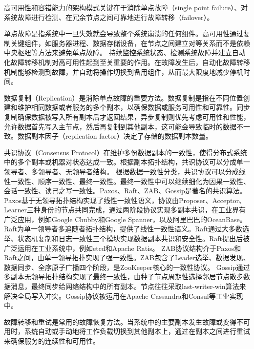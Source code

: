 高可用性和容错能力的架构模式关键在于消除单点故障（single point failure）、对系统故障进行检测、在冗余节点之间可靠地进行故障转移（failover）。

单点故障是指系统中一旦失效就会导致整个系统崩溃的任何组件。高可用性通过复制关键组件，如服务器进程、数据存储设备，在节点之间建立对等关系而不是依赖中央枢纽等方法来避免单点故障。
持续监控系统状态、检测系统故障并建立自动化故障转移机制对高可用性起到至关重要的作用。在故障发生后，自动化故障转移机制能够检测到故障，并自动将操作切换到备用组件，从而最大限度地减少停机时间。


数据复制（Replication）是消除单点故障的重要方法。数据复制是指在不同位置创建和维护相同数据或者服务的多个副本，以确保数据或服务可用性和可靠性。同步复制确保数据被写入所有副本后才返回结果，异步复制则优先考虑可用性和性能，允许数据首先写入主节点，然后再复制到其他副本，这可能会导致临时的数据不一致。数据副本因子（replication factor）决定了存储的数据副本数量。


共识协议（Consensus Protocol）在维护多份数据副本的一致性，使得分布式系统中的多个副本或机器对状态达成一致。根据副本拓扑结构，共识协议可以分成单一领导者、多领导者、无领导者结构。
根据数据一致性分类，共识协议可以分成线性一致性\cite{herlihy1990linearizability}、顺序一致性\cite{attiya1994sequential}、最终一致性\cite{bailis2013eventual}。最终一致性中可以继续细化为因果一致性\cite{lloyd2011cops}、会话一致性\cite{mortazavi2018session}、读己之写一致性\cite{nishtala2013memcached}。Paxos、Raft、ZAB、Gossip是著名的共识算法。
Paxos\cite{lamport2001paxos}基于无领导拓扑结构实现了线性一致性语义，协议由Proposer、Acceptor、Learner三种身份的节点共同完成，通过两阶段协议实现多副本共识，在工业界有广泛应用，例如Google Chubby\cite{burrows2006chubby}和Google Spanner\cite{corbett2013spanner}，以及阿里巴巴的OceanBase\cite{zhen2014oceanbase}。
Raft\cite{ongaro2014raft}为单一领导者多追随者拓扑结构，提供了线性一致性语义。Raft通过大多数选举、状态机复制和日志一致性三个模块实现数据副本共识和安全性。Raft提出后被广泛运用在工业系统中，例如etcd\cite{etcd}和Apache Ratis\cite{ratis}。
ZAB\cite{junqueira2011zab}协议结构介于Paxos和Raft之间，由单一领导拓扑实现了强一致性。ZAB包含了Leader选举、数据发现、数据同步、全序原子广播四个阶段，是ZooKeeper\cite{hunt2010zookeeper}核心的一致性协议。
Gossip\cite{demers1987gossip}通过多副本无领导拓扑结构实现了最终一致性，由种子节点周期性选择邻居节点散步数据消息，最终同步给网络结构中的所有副本。节点往往采取last-writer-win算法来解决全局写入冲突。Gossip协议被运用在Apache Cassandra\cite{lakshman2010cassandra}和Consul\cite{mishra1993consul}等工业实现中。


故障转移和重试是常用的故障恢复方法。当系统中的主要副本发生故障或变得不可用时，系统自动或手动地将工作负载切换到其他副本上，通过在副本之间进行重试来确保服务的连续性和可用性。

